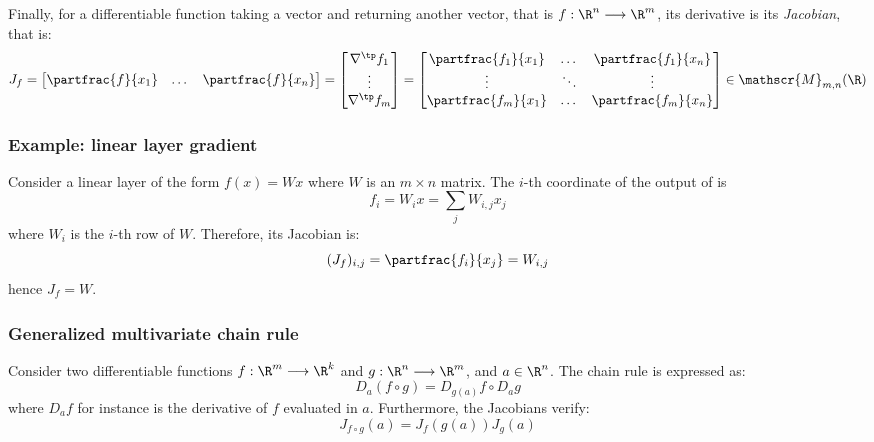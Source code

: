 Finally, for a differentiable function taking a vector and returning another vector, that is $f:\R^n\longrightarrow\R^m$, its derivative is its \emph{Jacobian}, that is:
\begin{equation*}
    J_f
    = \begin{bmatrix} \partfrac{f}{x_1} & \dots & \partfrac{f}{x_n}\end{bmatrix}
    = \begin{bmatrix}
        \nabla^\tp f_1\\
        \vdots\\
        \nabla^\tp f_m
    \end{bmatrix}
    = \begin{bmatrix}
        \partfrac{f_1}{x_1} & \dots & \partfrac{f_1}{x_n}\\
        \vdots & \ddots & \vdots\\
        \partfrac{f_m}{x_1} & \dots & \partfrac{f_m}{x_n}
    \end{bmatrix}
    \in\mathscr{M}_{m, n}(\R)
\end{equation*}

\subsubsection{Example: linear layer gradient}
Consider a linear layer of the form $f(x)=Wx$ where $W$ is an $m\times n$ matrix. The $i$-th coordinate of the output of is
\begin{equation*}
    f_i = W_ix=\sum_j W_{i,j}x_j
\end{equation*}
where $W_i$ is the $i$-th row of $W$. Therefore, its Jacobian is:
\begin{equation*}
    (J_f)_{i, j} = \partfrac{f_i}{x_j} = W_{i, j}
\end{equation*}
hence $J_f=W$.

\subsubsection{Generalized multivariate chain rule}
Consider two differentiable functions $f:\R^m\longrightarrow\R^k$ and $g:\R^n\longrightarrow\R^m$, and $a\in\R^n$. The chain rule is expressed as:
\begin{equation}
    D_a(f\circ g) = D_{g(a)}f\circ D_ag
\end{equation}
where $D_af$ for instance is the derivative of $f$ evaluated in $a$. Furthermore, the Jacobians verify:
\begin{equation}
    J_{f\circ g}(a)=J_f(g(a)) J_g(a)
\end{equation}